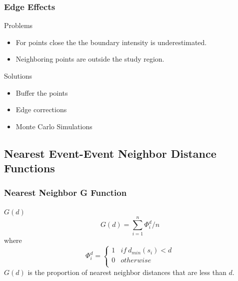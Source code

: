 \documentclass[nototal,handout]{beamer}
\begin{document}
  \begin{frame}[<+->]
    \frametitle{Edge Effects}
    \begin{block}{Problems}
      \begin{itemize}
	\item For points close the the boundary intensity is underestimated.
	\item Neighboring points are outside the study region.
      \end{itemize}
\end{block}
      \begin{block}{Solutions}
	\begin{itemize}
	  \item Buffer the points
	  \item Edge corrections
	  \item Monte Carlo Simulations
	\end{itemize}
      \end{block}
   \end{frame}

\subsection{Nearest Event-Event Neighbor Distance Functions}

\begin{frame}[<+->]
    \frametitle{Nearest Neighbor G Function}
    \begin{block}{$G(d)$}
      \begin{equation}
	G(d) = \sum_{i=1}^n \Phi_{i}^d / n
      \end{equation}
      where
\begin{equation}
	\Phi_{i}^d = \left\{ \begin{array}{ll}
	  1& if \ d_{min}(s_i) < d \\
	  0&otherwise\\
	\end{array} \right.
      \end{equation}
      $G(d)$ is the proportion of nearest neighbor distances that are less
      than $d$.
    \end{block}
  \end{frame}
\end{document}
